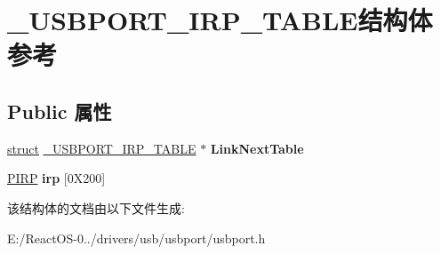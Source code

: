 \hypertarget{struct___u_s_b_p_o_r_t___i_r_p___t_a_b_l_e}{}\section{\+\_\+\+U\+S\+B\+P\+O\+R\+T\+\_\+\+I\+R\+P\+\_\+\+T\+A\+B\+L\+E结构体 参考}
\label{struct___u_s_b_p_o_r_t___i_r_p___t_a_b_l_e}
\subsection*{Public 属性}
\begin{DoxyCompactItemize}
\item 
\mbox{\label{struct___u_s_b_p_o_r_t___i_r_p___t_a_b_l_e_aad7ee219e1a8b5fcf38f5d7b2786ec4e}} 
\hyperlink{interfacestruct}{struct} \hyperlink{struct___u_s_b_p_o_r_t___i_r_p___t_a_b_l_e}{\+\_\+\+U\+S\+B\+P\+O\+R\+T\+\_\+\+I\+R\+P\+\_\+\+T\+A\+B\+LE} $\ast$ {\bfseries Link\+Next\+Table}
\item 
\mbox{\label{struct___u_s_b_p_o_r_t___i_r_p___t_a_b_l_e_a4d0b107d0a8bf242d7f20c0cb91389ff}} 
\hyperlink{interfacevoid}{P\+I\+RP} {\bfseries irp} \mbox{[}0\+X200\mbox{]}
\end{DoxyCompactItemize}


该结构体的文档由以下文件生成\+:\begin{DoxyCompactItemize}
\item 
E\+:/\+React\+O\+S-\/0../drivers/usb/usbport/usbport.\+h\end{DoxyCompactItemize}

